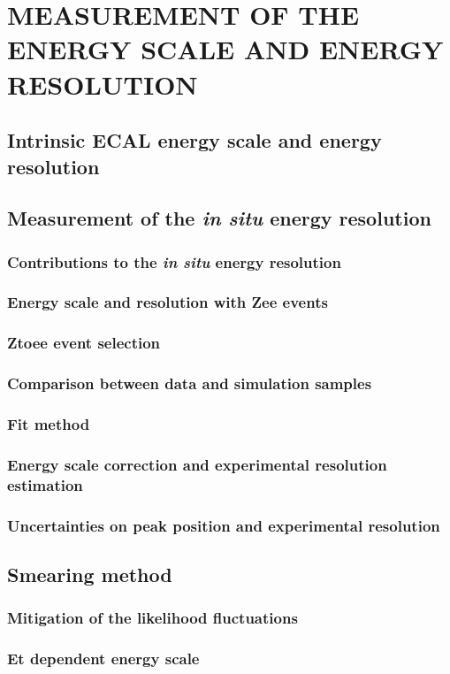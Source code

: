 \chapter{MEASUREMENT OF THE ENERGY SCALE AND ENERGY RESOLUTION}
\section{Intrinsic ECAL energy scale and energy resolution}
\section{Measurement of the \textit{in situ} energy resolution}
\subsection{Contributions to the \textit{in situ} energy resolution}
\subsection{Energy scale and resolution with Zee events}
\subsection{Ztoee event selection}
\subsection{Comparison between data and simulation samples}
\subsection{Fit method}
\subsection{Energy scale correction and experimental resolution estimation}
\subsection{Uncertainties on peak position and experimental resolution}
\section{Smearing method}
\subsection{Mitigation of the likelihood fluctuations}
\subsection{Et dependent energy scale}
